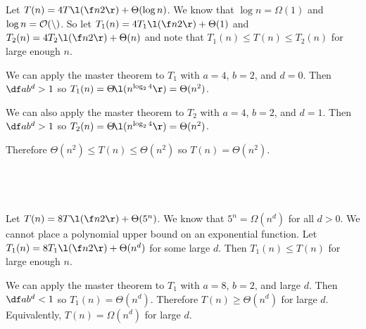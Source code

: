 \documentclass[a4paper]{article}
\begin{document}

\subsection{~}

Let $T(n) = 4T\l(\f n2\r) + \Theta(\log n)$. We know that $\log n = \Omega(1)$ and $\log n = \cal O(n)$. So let $T_1(n) = 4T_1\l(\f n2\r) + \Theta(1)$ and $T_2(n) = 4T_2\l(\f n2\r) + \Theta(n)$ and note that $T_1(n) \le T(n) \le T_2(n)$ for large enough $n$.

We can apply the master theorem to $T_1$ with $a=4$, $b=2$, and $d=0$. Then $\df a{b^d} > 1$ so $T_1(n) = \Theta\!\l(n^{\log_2 4}\r) = \Theta(n^2)$.

We can also apply the master theorem to $T_2$ with $a=4$, $b=2$, and $d=1$. Then $\df a{b^d} > 1$ so $T_2(n) = \Theta\!\l(n^{\log_2 4}\r) = \Theta(n^2)$.

Therefore $\Theta(n^2) \le T(n) \le \Theta(n^2)$ so $T(n) = \Theta(n^2)$.

\subsection{~}

Let $T(n) = 8T\l(\f n2\r) + \Theta(5^n)$. We know that $5^n = \Omega(n^d)$ for all $d > 0$. We cannot place a polynomial upper bound on an exponential function. Let $T_1(n) = 8T_1\l(\f n2\r) + \Theta(n^d)$ for some large $d$. Then $T_1(n) \le T(n)$ for large enough $n$.

We can apply the master theorem to $T_1$ with $a=8$, $b=2$, and large $d$. Then $\df a{b^d} < 1$ so $T_1(n) = \Theta(n^d)$. Therefore $T(n) \ge \Theta(n^d)$ for large $d$. Equivalently, $T(n) = \Omega(n^d)$ for large $d$.






\end{document}
